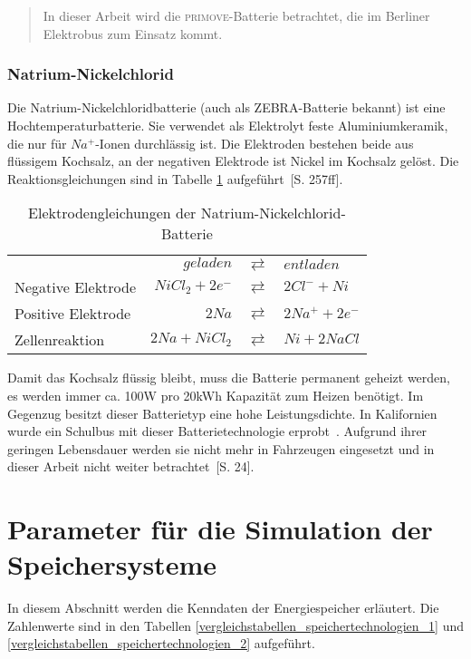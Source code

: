 \begin{quote}
	In dieser Arbeit wird die \textsc{primove}-Batterie betrachtet, die im Berliner Elektrobus zum Einsatz kommt.
\end{quote}

\subsubsection{Natrium-Nickelchlorid}
Die Natrium-Nickelchloridbatterie (auch als ZEBRA-Batterie bekannt) ist eine Hochtemperaturbatterie. Sie verwendet als Elektrolyt feste Aluminiumkeramik, die nur für $Na^+$-Ionen durchlässig ist. Die Elektroden bestehen beide aus flüssigem Kochsalz, an der negativen Elektrode ist Nickel im Kochsalz gelöst. Die Reaktionsgleichungen sind in Tabelle \ref{ZEBRA} aufgeführt~\cite{KiehneBattery}[S. 257ff].

\begin{table}\centering
	\begin{tabularx}{\linewidth}{XrcX}
		\toprule
		&       $geladen$ & $\rightleftarrows$ & $entladen$           \\
		Negative Elektrode & $NiCl_2 + 2e^-$ & $\rightleftarrows$ & $2Cl^- + Ni$ \\
		Positive Elektrode &           $2Na$ & $\rightleftarrows$ & $2Na^+ + 2e^-$               \\ \midrule
		Zellenreaktion     &  $2Na + NiCl_2$ & $\rightleftarrows$ & $Ni + 2NaCl$ \\ \bottomrule
	\end{tabularx}
	\caption{Elektrodengleichungen der Natrium-Nickelchlorid-Batterie}
	\label{ZEBRA}
\end{table}

Damit das Kochsalz flüssig bleibt, muss die Batterie permanent geheizt werden, es werden immer ca. 100W pro 20kWh Kapazität zum Heizen benötigt. Im Gegenzug besitzt dieser Batterietyp eine hohe Leistungsdichte. In Kalifornien wurde ein Schulbus mit dieser Batterietechnologie erprobt~\cite{Electric-Transportation-Department:2004}. Aufgrund ihrer geringen Lebensdauer werden sie nicht mehr in Fahrzeugen eingesetzt und in dieser Arbeit nicht weiter betrachtet~\cite{Schimke:2012}[S. 24].

\section{Parameter für die Simulation der Speichersysteme}
In diesem Abschnitt werden die Kenndaten der Energiespeicher erläutert. Die Zahlenwerte sind in den Tabellen \ref{vergleichstabellen_speichertechnologien_1} und \ref{vergleichstabellen_speichertechnologien_2} aufgeführt.

